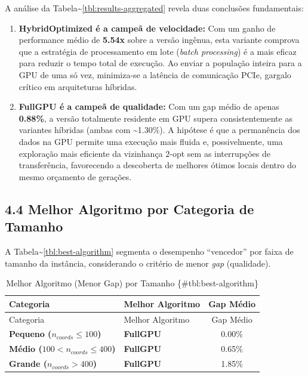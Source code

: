 A análise da Tabela\textasciitilde{}\ref{tbl:results-aggregated} revela
duas conclusões fundamentais:

\begin{enumerate}
\def\labelenumi{\arabic{enumi}.}
\tightlist
\item
  \textbf{HybridOptimized é a campeã de velocidade:} Com um ganho de
  performance médio de \textbf{5.54x} sobre a versão ingênua, esta
  variante comprova que a estratégia de processamento em lote
  (\emph{batch processing}) é a mais eficaz para reduzir o tempo total
  de execução. Ao enviar a população inteira para a GPU de uma só vez,
  minimiza-se a latência de comunicação PCIe, gargalo crítico em
  arquiteturas híbridas.
\item
  \textbf{FullGPU é a campeã de qualidade:} Com um gap médio de apenas
  \textbf{0.88\%}, a versão totalmente residente em GPU supera
  consistentemente as variantes híbridas (ambas com
  \textasciitilde1.30\%). A hipótese é que a permanência dos dados na
  GPU permite uma execução mais fluida e, possivelmente, uma exploração
  mais eficiente da vizinhança \(2\)-opt sem as interrupções de
  transferência, favorecendo a descoberta de melhores ótimos locais
  dentro do mesmo orçamento de gerações.
\end{enumerate}

\subsection{4.4 Melhor Algoritmo por Categoria de
Tamanho}\label{sec-44-melhor-algoritmo}

A Tabela\textasciitilde{}\ref{tbl:best-algorithm} segmenta o desempenho
``vencedor'' por faixa de tamanho da instância, considerando o critério
de menor \emph{gap} (qualidade).

\begin{longtable}[]{@{}llc@{}}
\caption{Melhor Algoritmo (Menor Gap) por Tamanho
\{\#tbl:best-algorithm\}}\tabularnewline
\toprule\noalign{}
Categoria & Melhor Algoritmo & Gap Médio \\
\midrule\noalign{}
\endfirsthead
\toprule\noalign{}
Categoria & Melhor Algoritmo & Gap Médio \\
\midrule\noalign{}
\endhead
\bottomrule\noalign{}
\endlastfoot
\textbf{Pequeno (\(n_{coords} \le 100\))} & \textbf{FullGPU} & 0.00\% \\
\textbf{Médio (\(100 < n_{coords} \le 400\))} & \textbf{FullGPU} &
0.65\% \\
\textbf{Grande (\(n_{coords} > 400\))} & \textbf{FullGPU} & 1.85\% \\
\end{longtable}

